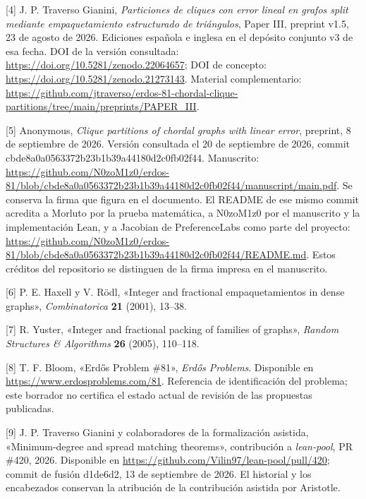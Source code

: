 \documentclass[spanish,11pt,a4paper]{article}
\begin{document}
{[}4{]} J. P. Traverso Gianini, \emph{Particiones de cliques con error lineal en grafos split mediante empaquetamiento estructurado de triángulos}, Paper III, preprint v1.5, 23 de agosto de 2026. Ediciones española e inglesa en el depósito conjunto v3 de esa fecha. DOI de la versión consultada: \url{https://doi.org/10.5281/zenodo.22064657}; DOI de concepto: \url{https://doi.org/10.5281/zenodo.21273143}. Material complementario: \url{https://github.com/jtraverso/erdos-81-chordal-clique-partitions/tree/main/preprints/PAPER_III}.

{[}5{]} Anonymous, \emph{Clique partitions of chordal graphs with linear error}, preprint, 8 de septiembre de 2026. Versión consultada el 20 de septiembre de 2026, commit {\ttfamily\small cbde8a0a0563\discretionary{\hbox{\ensuremath{\hookrightarrow}}}{}{}372b23b1b39a\discretionary{\hbox{\ensuremath{\hookrightarrow}}}{}{}44180d2c0fb0\discretionary{\hbox{\ensuremath{\hookrightarrow}}}{}{}2f44}. Manuscrito: \url{https://github.com/N0zoM1z0/erdos-81/blob/cbde8a0a0563372b23b1b39a44180d2c0fb02f44/manuscript/main.pdf}. Se conserva la firma que figura en el documento. El README de ese mismo commit acredita a Morluto por la prueba matemática, a N0zoM1z0 por el manuscrito y la implementación Lean, y a Jacobian de PreferenceLabs como parte del proyecto: \url{https://github.com/N0zoM1z0/erdos-81/blob/cbde8a0a0563372b23b1b39a44180d2c0fb02f44/README.md}. Estos créditos del repositorio se distinguen de la firma impresa en el manuscrito.

{[}6{]} P. E. Haxell y V. Rödl, «Integer and fractional empaquetamientos in dense graphs», \emph{Combinatorica} \textbf{21} (2001), 13--38.

{[}7{]} R. Yuster, «Integer and fractional packing of families of graphs», \emph{Random Structures \& Algorithms} \textbf{26} (2005), 110--118.

{[}8{]} T. F. Bloom, «Erdős Problem \#81», \emph{Erdős Problems}. Disponible en \url{https://www.erdosproblems.com/81}. Referencia de identificación del problema; este borrador no certifica el estado actual de revisión de las propuestas publicadas.

{[}9{]} J. P. Traverso Gianini y colaboradores de la formalización asistida, «Minimum-degree and spread matching theorems», contribución a \emph{lean-pool}, PR \#420, 2026. Disponible en \url{https://github.com/Vilin97/lean-pool/pull/420}; commit de fusión {\ttfamily\small d1de6d2}, 13 de septiembre de 2026. El historial y los encabezados conservan la atribución de la contribución asistida por Aristotle.
\end{document}
